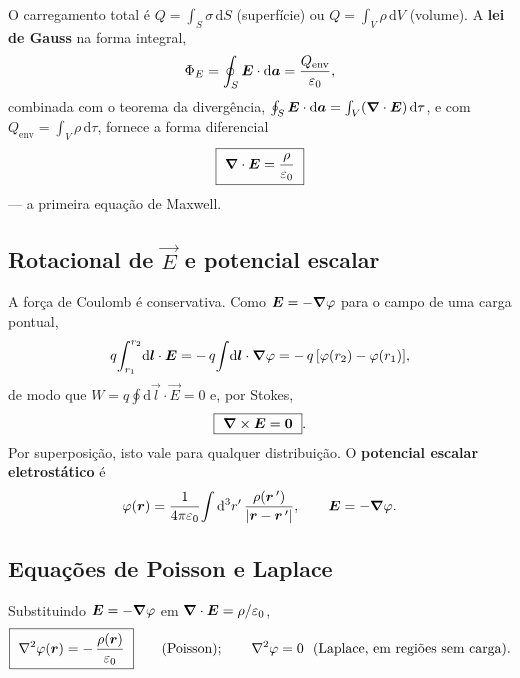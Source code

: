 O carregamento total é $Q=\int_{S}\sigma\,\mathrm{d}S$ (superfície) ou
$Q=\int_{V}\rho\,\mathrm{d}V$ (volume). A \textbf{lei de Gauss} na forma integral,
\begin{equation}
  \Phi_E=\oint_{S}\bm{E}\cdot\mathrm{d}\bm{a}=\frac{Q_{\text{env}}}{\varepsilon_{0}},
\end{equation}
combinada com o teorema da divergência,
$\oint_S\bm{E}\cdot\mathrm{d}\bm{a}=\int_V(\bm{\nabla}\cdot\bm{E})\,\mathrm{d}\tau$, e
com $Q_{\text{env}}=\int_V\rho\,\mathrm{d}\tau$, fornece a forma diferencial
\begin{equation}
  \boxed{\ \grad\cdot\vec{E}=\frac{\rho}{\eps}\ }
\end{equation}
— a primeira equação de Maxwell.

\subsection{Rotacional de \texorpdfstring{$\vec{E}$}{E} e potencial escalar}

A força de Coulomb é conservativa. Como
$\bm{E}=-\bm{\nabla}\varphi$ para o campo de uma carga pontual,
\begin{equation}
  q\!\int_{r_1}^{r_2}\!\mathrm{d}\bm{l}\cdot\bm{E}
  =-\,q\!\int\!\mathrm{d}\bm{l}\cdot\bm{\nabla}\varphi
  =-\,q\,[\varphi(r_2)-\varphi(r_1)],
\end{equation}
de modo que $W=q\oint\mathrm{d}\vec{l}\cdot\vec{E}=0$ e, por Stokes,
\begin{equation}
  \boxed{\ \grad\times\vec{E}=\vec{0}\ }.
\end{equation}
Por superposição, isto vale para qualquer distribuição. O \textbf{potencial
escalar eletrostático} é
\begin{equation}
  \varphi(\bm{r})=\frac{1}{4\pi\varepsilon_{0}}\!\int \mathrm{d}^3r'\,
     \frac{\rho(\bm{r}\,')}{|\bm{r}-\bm{r}\,'|},
  \qquad \bm{E}=-\bm{\nabla}\varphi.
\end{equation}

\subsection{Equações de Poisson e Laplace}

Substituindo $\bm{E}=-\bm{\nabla}\varphi$ em $\bm{\nabla}\cdot\bm{E}=\rho/\varepsilon_{0}$,
\begin{equation}
  \boxed{\ \nabla^{2}\varphi(\vec{r})=-\,\frac{\rho(\vec{r})}{\eps}\ }
  \qquad(\text{Poisson});\qquad
  \nabla^{2}\varphi=0\ \ (\text{Laplace, em regi\~oes sem carga}).
\end{equation}

